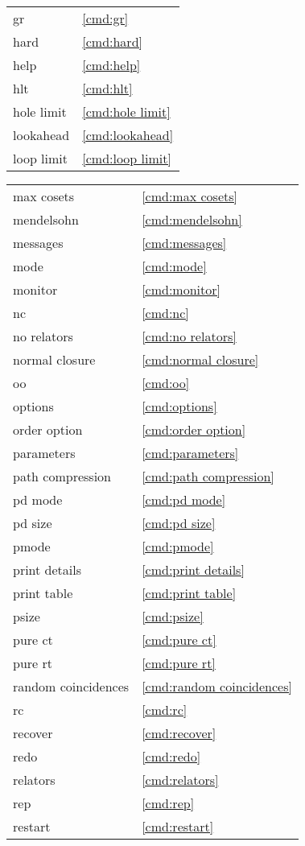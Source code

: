 {\begin{minipage}[b]{6cm}
\begin{tabular}{ll}
gr&\ref{cmd:gr}\\
hard&\ref{cmd:hard}\\
help&\ref{cmd:help}\\
hlt&\ref{cmd:hlt}\\
hole limit&\ref{cmd:hole limit}\\
lookahead&\ref{cmd:lookahead}\\
loop limit&\ref{cmd:loop limit}\\
\end{tabular}
\end{minipage}
\begin{minipage}[b]{6cm}
\begin{tabular}{ll}
max cosets&\ref{cmd:max cosets}\\
mendelsohn&\ref{cmd:mendelsohn}\\
messages&\ref{cmd:messages}\\
mode&\ref{cmd:mode}\\
monitor&\ref{cmd:monitor}\\
nc&\ref{cmd:nc}\\
no relators&\ref{cmd:no relators}\\
normal closure&\ref{cmd:normal closure}\\
oo&\ref{cmd:oo}\\
options&\ref{cmd:options}\\
order option&\ref{cmd:order option}\\
parameters&\ref{cmd:parameters}\\
path compression&\ref{cmd:path compression}\\
pd mode&\ref{cmd:pd mode}\\
pd size&\ref{cmd:pd size}\\
pmode&\ref{cmd:pmode}\\
print details&\ref{cmd:print details}\\
print table&\ref{cmd:print table}\\
psize&\ref{cmd:psize}\\
pure ct&\ref{cmd:pure ct}\\
pure rt&\ref{cmd:pure rt}\\
random coincidences\quad&\ref{cmd:random coincidences}\\
rc&\ref{cmd:rc}\\
recover&\ref{cmd:recover}\\
redo&\ref{cmd:redo}\\
relators&\ref{cmd:relators}\\
rep&\ref{cmd:rep}\\
restart&\ref{cmd:restart}\\

\end{tabular}
\end{minipage}}
